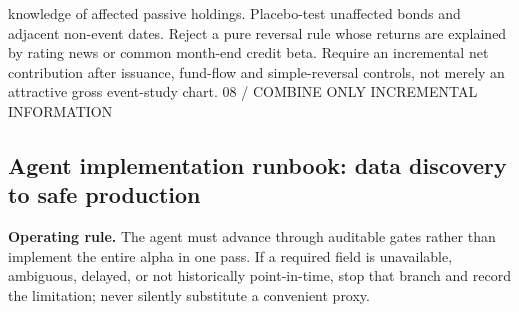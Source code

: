 \documentclass[10pt]{article}
\begin{document}
knowledge of affected passive holdings. Placebo-test unaffected bonds and adjacent non-event dates. Reject a pure reversal rule whose returns are explained by rating news or common month-end credit beta. Require an incremental net contribution after issuance, fund-flow and simple-reversal controls, not merely an attractive gross event-study chart. 08 / COMBINE ONLY INCREMENTAL INFORMATION
\subsection{Agent implementation runbook: data discovery to safe production}
\textbf{Operating rule.} The agent must advance through auditable gates rather than implement the entire alpha in one pass. If a required field is unavailable, ambiguous, delayed, or not historically point-in-time, stop that branch and record the limitation; never silently substitute a convenient proxy.
\end{document}
